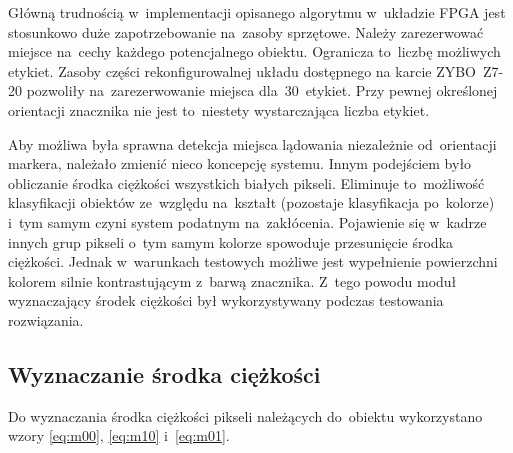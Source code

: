 Główną trudnością w~implementacji opisanego algorytmu w~układzie FPGA jest stosunkowo duże zapotrzebowanie na~zasoby sprzętowe. 
Należy zarezerwować miejsce na~cechy każdego potencjalnego obiektu. 
Ogranicza to~liczbę możliwych etykiet. 
Zasoby części rekonfigurowalnej układu dostępnego na karcie ZYBO~Z7-20 pozwoliły na~zarezerwowanie miejsca dla~30~etykiet. 
Przy pewnej określonej orientacji znacznika nie jest to~niestety wystarczająca liczba etykiet. %

Aby możliwa była sprawna detekcja miejsca lądowania niezależnie od~orientacji markera, należało zmienić nieco koncepcję systemu. 
Innym podejściem było obliczanie środka ciężkości wszystkich białych pikseli. 
Eliminuje to~możliwość klasyfikacji obiektów ze~względu na~kształt (pozostaje klasyfikacja po~kolorze) i~tym samym czyni system podatnym na~zakłócenia. 
Pojawienie się w~kadrze innych grup pikseli o~tym samym kolorze spowoduje przesunięcie środka ciężkości.
Jednak w~warunkach testowych możliwe jest wypełnienie powierzchni kolorem silnie kontrastującym z~barwą znacznika. 
Z~tego powodu moduł wyznaczający środek ciężkości był wykorzystywany podczas testowania rozwiązania.

\subsection{Wyznaczanie środka ciężkości}
\label{subsec:srodek_ciezosci}

Do wyznaczania środka ciężkości pikseli należących do~obiektu wykorzystano wzory \eqref{eq:m00}, \eqref{eq:m10} i~\eqref{eq:m01}.

